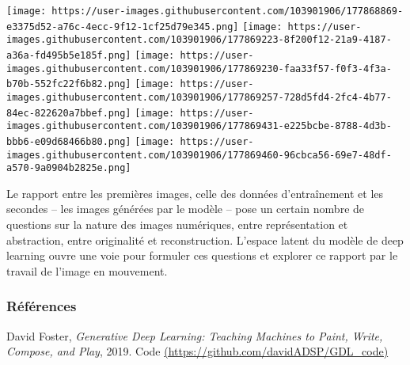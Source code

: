 \documentclass[
]{article}
\begin{document}
\texttt{[image: https://user-images.githubusercontent.com/103901906/177868869-e3375d52-a76c-4ecc-9f12-1cf25d79e345.png]} \texttt{[image: https://user-images.githubusercontent.com/103901906/177869223-8f200f12-21a9-4187-a36a-fd495b5e185f.png]} \texttt{[image: https://user-images.githubusercontent.com/103901906/177869230-faa33f57-f0f3-4f3a-b70b-552fc22f6b82.png]} \texttt{[image: https://user-images.githubusercontent.com/103901906/177869257-728d5fd4-2fc4-4b77-84ec-822620a7bbef.png]} \texttt{[image: https://user-images.githubusercontent.com/103901906/177869431-e225bcbe-8788-4d3b-bbb6-e09d68466b80.png]} \texttt{[image: https://user-images.githubusercontent.com/103901906/177869460-96cbca56-69e7-48df-a570-9a0904b2825e.png]}

Le rapport entre les premières images, celle des données d'entraînement et les secondes -- les images générées par le modèle -- pose un certain nombre de questions sur la nature des images numériques, entre représentation et abstraction, entre originalité et reconstruction. L'espace latent du modèle de deep learning ouvre une voie pour formuler ces questions et explorer ce rapport par le travail de l'image en mouvement.

\hypertarget{ruxe9fuxe9rences}{%
\subsubsection{Références}\label{ruxe9fuxe9rences}}

David Foster, \emph{Generative Deep Learning: Teaching Machines to Paint, Write, Compose, and Play}, 2019. Code \href{https://github.com/davidADSP/GDL_code}{(https://github.com/davidADSP/GDL\_code)}
\end{document}
